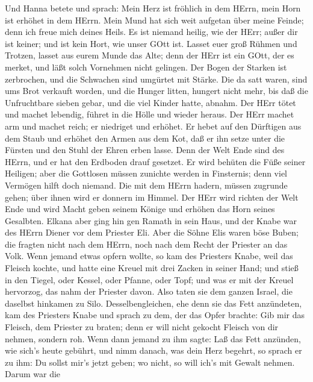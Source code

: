  Und Hanna betete und sprach: Mein Herz ist fröhlich in dem
HErrn, mein Horn ist erhöhet in dem HErrn. Mein Mund hat sich weit
aufgetan über meine Feinde; denn ich freue mich deines Heils.
 Es ist niemand heilig, wie der HErr; außer dir ist keiner;
und ist kein Hort, wie unser GOtt ist.  Lasset euer groß
Rühmen und Trotzen, lasset aus eurem Munde das Alte; denn der HErr ist
ein GOtt, der es merket, und läßt solch Vornehmen nicht gelingen.
 Der Bogen der Starken ist zerbrochen, und die Schwachen
sind umgürtet mit Stärke.  Die da satt waren, sind ums Brot
verkauft worden, und die Hunger litten, hungert nicht mehr, bis daß die
Unfruchtbare sieben gebar, und die viel Kinder hatte, abnahm.
 Der HErr tötet und machet lebendig, führet in die Hölle und
wieder heraus.  Der HErr machet arm und machet reich; er
niedriget und erhöhet.  Er hebet auf den Dürftigen aus dem
Staub und erhöhet den Armen aus dem Kot, daß er ihn setze unter die
Fürsten und den Stuhl der Ehren erben lasse. Denn der Welt Ende sind des
HErrn, und er hat den Erdboden drauf gesetzet.  Er wird
behüten die Füße seiner Heiligen; aber die Gottlosen müssen zunichte
werden in Finsternis; denn viel Vermögen hilft doch niemand.
 Die mit dem HErrn hadern, müssen zugrunde gehen; über
ihnen wird er donnern im Himmel. Der HErr wird richten der Welt Ende und
wird Macht geben seinem Könige und erhöhen das Horn seines Gesalbten.
 Elkana aber ging hin gen Ramath in sein Haus, und der
Knabe war des HErrn Diener vor dem Priester Eli.  Aber die
Söhne Elis waren böse Buben; die fragten nicht nach dem HErrn,
 noch nach dem Recht der Priester an das Volk. Wenn jemand
etwas opfern wollte, so kam des Priesters Knabe, weil das Fleisch
kochte, und hatte eine Kreuel mit drei Zacken in seiner Hand;
 und stieß in den Tiegel, oder Kessel, oder Pfanne, oder
Topf; und was er mit der Kreuel hervorzog, das nahm der Priester davon.
Also taten sie dem ganzen Israel, die daselbst hinkamen zu Silo.
 Desselbengleichen, ehe denn sie das Fett anzündeten, kam
des Priesters Knabe und sprach zu dem, der das Opfer brachte: Gib mir
das Fleisch, dem Priester zu braten; denn er will nicht gekocht Fleisch
von dir nehmen, sondern roh.  Wenn dann jemand zu ihm
sagte: Laß das Fett anzünden, wie sich's heute gebührt, und nimm danach,
was dein Herz begehrt, so sprach er zu ihm: Du sollst mir's jetzt geben;
wo nicht, so will ich's mit Gewalt nehmen.  Darum war die

